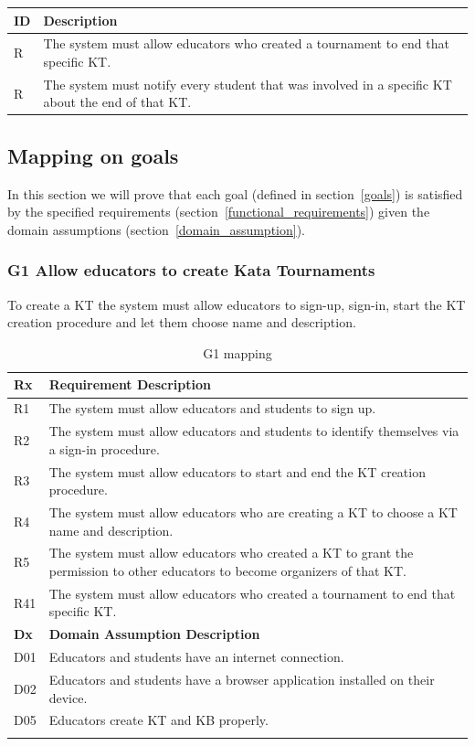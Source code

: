 \documentclass[11pt]{report}
\newcounter{rcounter}
\newcommand{\rc}{
    \addtocounter{rcounter}{1}
    R\arabic{rcounter}
}
\begin{document}
\begin{longtable}[h] {|p{10mm}|p{130mm}|}
\hline
\rowcolor{gray!20}
\textbf{ID} & \textbf{Description} \\ \hline
    \rc & The system must allow educators who created a tournament to end that specific KT\@.
    \\ \hline
    \rc & The system must notify every student that was involved in a specific KT about the end of that KT\@.
    \\ \hline
\end{longtable}

\cleardoublepage
\subsection{Mapping on goals}

In this section we will prove that each goal (defined in section~\ref{goals}) is satisfied by the specified requirements (section~\ref{functional_requirements}) given the domain assumptions (section~\ref{domain_assumption}).


\subsubsection{G1 Allow educators to create Kata Tournaments}
To create a KT the system must allow educators to sign-up, sign-in, start the KT creation procedure and let them choose name and description.

\begin{longtable}[h] {|p{10mm} p{130mm}|} 
\hline
\textbf{Rx} & \textbf{Requirement Description} \\ \hline
    R1  & The system must allow educators and students to sign up. \\ 
    R2  & The system must allow educators and students to identify themselves via a sign-in procedure.\\
    R3  & The system must allow educators to start and end the KT creation procedure.\\
    R4  & The system must allow educators who are creating a KT to choose a KT name and description.\\
    R5  & The system must allow educators who created a KT to grant the permission to other educators to become organizers of that KT.\\
    R41 & The system must allow educators who created a tournament to end that specific KT.\\
\hline
\textbf{Dx} & \textbf{Domain Assumption Description} \\ \hline
    D01 & Educators and students have an internet connection.\\
    D02 & Educators and students have a browser application installed on their device. \\
    D05 & Educators create KT and KB properly.\\ \hline
\caption{G1 mapping}
\end{longtable}
\end{document}
